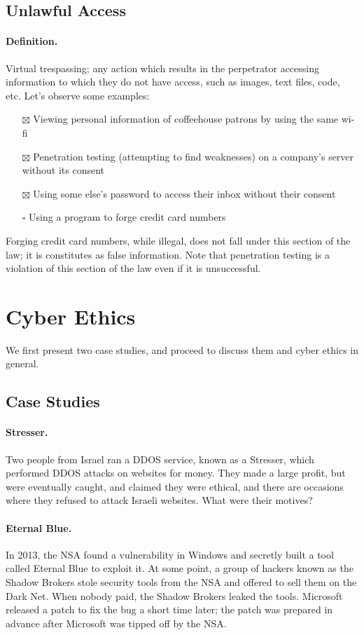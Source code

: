 \subsection{Unlawful Access}
\paragraph{Definition.} Virtual trespassing; any action which results in the perpetrator accessing information to which they do not have access, such as images, text files, code, etc.
Let's observe some examples:
\begin{itemize}
    \item[$\boxtimes$] Viewing personal information of coffeehouse patrons by using the same wi-fi
    \item[$\boxtimes$] Penetration testing (attempting to find weaknesses) on a company's server without its consent
    \item[$\boxtimes$] Using some else's password to access their inbox without their consent
    \item[$\square$] Using a program to forge credit card numbers
\end{itemize}
Forging credit card numbers, while illegal, does not fall under this section of the law; it is constitutes as false information. Note that penetration testing is a violation of this section of the law even if it is unsuccessful.


\section{Cyber Ethics}\label{sec:cyber_ethics}
We first present two case studies, and proceed to discuss them and cyber ethics in general.


\subsection{Case Studies}
\paragraph{Stresser.} Two people from Israel ran a DDOS service, known as a Stresser, which performed DDOS attacks on websites for money. They made a large profit, but were eventually caught, and claimed they were ethical, and there are occasions where they refused to attack Israeli websites. What were their motives?


\paragraph{Eternal Blue.} In 2013, the NSA found a vulnerability in Windows \cite{CVE-2017-0144} and secretly built a tool called Eternal Blue to exploit it. At some point, a group of hackers known as the Shadow Brokers stole security tools from the NSA and offered to sell them on the Dark Net. When nobody paid, the Shadow Brokers leaked the tools. Microsoft released a patch to fix the bug a short time later; the patch was prepared in advance after Microsoft was tipped off by the NSA.


